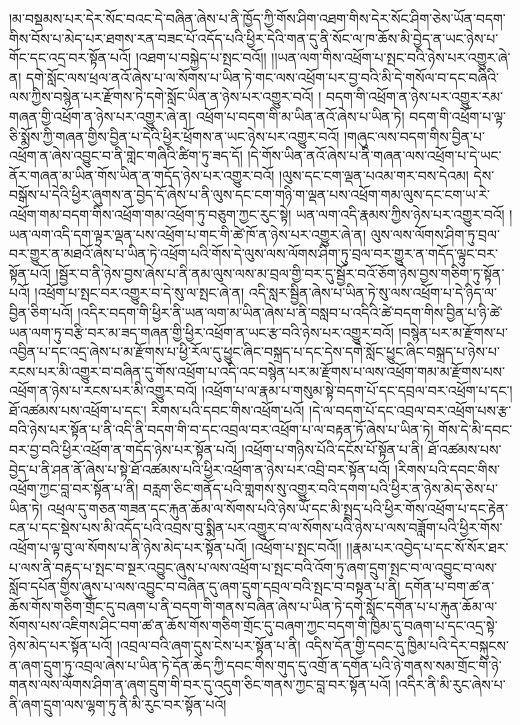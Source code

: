 །མ་བསྡམས་པར་དེར་སོང་བའང་དེ་བཞིན་ཞེས་པ་ནི་ཁྱོད་ཀྱི་གོས་ཤིག་འཐག་གིས་དེར་སོང་ཤིག་ཅེས་ཡོན་བདག་གིས་བོས་པ་མེད་པར་ཐགས་རན་བཟང་པོ་འདོད་པའི་ཕྱིར་དེའི་གན་དུ་ནི་སོང་ལ་ཁ་ཆོས་མི་བྱེད་ན་ཡང་ཉེས་པ་གོང་དང་འདྲ་བར་སྟོན་པའོ། །འཐག་པ་བསྐྱེད་པ་སྤང་བའོ།། །།ཡན་ལག་གིས་འཕྲོག་པ་སྤང་བའི་ཉེས་པར་འགྱུར་ཞེ་ན། དགེ་སློང་ལས་ཕྲལ་ནའོ་ཞེས་པ་ལ་སོགས་པ་ཡིན་ཏེ་གང་ལས་འཕྲོག་པར་བྱ་བའི་མི་དེ་གསོལ་བ་དང་བཞིའི་ལས་ཀྱིས་བསྙེན་པར་རྫོགས་ཏེ་དགེ་སློང་ཡིན་ན་ཉེས་པར་འགྱུར་བའོ། །
བདག་གི་འཕྲོག་ན་ཉེས་པར་འགྱུར་རམ་གཞན་གྱི་འཕྲོག་ན་ཉེས་པར་འགྱུར་ཞེ་ན། འཕྲོག་པ་བདག་གི་མ་ཡིན་ནའོ་ཞེས་པ་ཡིན་ཏེ། བདག་གི་འཕྲོག་པ་ལྟ་ཅི་སྨོས་ཀྱི་གཞན་གྱིས་བྱིན་པ་དེའི་ཕྱིར་ཕྲོགས་ན་ཡང་ཉེས་པར་འགྱུར་བའོ། །གཞུང་ལས་བདག་གིས་བྱིན་པ་འཕྲོག་ན་ཞེས་འབྱུང་བ་ནི་གླེང་གཞིའི་ཚིག་ཏུ་ཟད་དོ། །དེ་གོས་ཡིན་ནའོ་ཞེས་པ་ནི་གཞན་ལས་འཕྲོག་པ་དེ་ཡང་ནོར་གཞན་མ་ཡིན་གོས་ཡིན་ན་གདོད་ཉེས་པར་འགྱུར་བའོ། །ལུས་དང་ངག་ལྡན་པའམ་གར་བས་དེའམ། དེས་བསྒོས་པ་དེའི་ཕྱིར་ཞུགས་ན་བྱེད་དོ་ཞེས་པ་ནི་ལུས་དང་ངག་གཉི་ག་ལྡན་པས་འཕྲོག་གམ་ལུས་དང་ངག་ཡ་རེ་འཕྲོག་གམ་བདག་གིས་འཕྲོག་གམ་འཕྲོག་ཏུ་བཅུག་ཀྱང་རུང་སྟེ། ཡན་ལག་འདི་རྣམས་ཀྱིས་ཉེས་པར་འགྱུར་བའོ། །ཡན་ལག་འདི་དག་ལྟར་ལྡན་པས་འཕྲོག་པ་གང་གི་ཚེ་ཁོ་ན་ཉེས་པར་འགྱུར་ཞེ་ན། ལུས་ལས་ལོགས་ཤིག་ཏུ་བྲལ་བར་གྱུར་ན་མཐའོ་ཞེས་པ་ཡིན་ཏེ་འཕྲོག་པའི་གོས་དེ་ལུས་ལས་ལོགས་ཤིག་ཏུ་བྲལ་བར་གྱུར་ན་གདོད་ལྟུང་བར་སྟོན་པའོ། །སྦྱོར་བ་ནི་ཉེས་བྱས་ཞེས་པ་ནི་ནམ་ལུས་ལས་མ་བྲལ་གྱི་བར་དུ་སྦྱོར་བའོ་ཅོག་ཉེས་བྱས་གཅིག་ཏུ་སྟོན་པའོ། །འཕྲོག་པ་སྤང་བར་འགྱུར་བ་དེ་སུ་ལ་སྤང་ཞེ་ན། འདི་སླར་སྦྱིན་ཞེས་པ་ཡིན་ཏེ་སུ་ལས་འཕྲོག་པ་དེ་ཉིད་ལ་བྱིན་ཅིག་པའོ། །འདིར་བདག་གི་ཕྱིར་ནི་ཡན་ལག་མ་ཡིན་ཞེས་པ་ནི་བསླབ་པ་འདིའི་ཚེ་བདག་གིས་བྱིན་པ་ཉི་ཚེ་ཡན་ལག་ཏུ་བརྩི་བར་མ་ཟད་གཞན་གྱི་ཕྱིར་འཕྲོག་ན་ཡང་རྩ་བའི་ཉེས་པར་འགྱུར་བའོ། །བསྙེན་པར་མ་རྫོགས་པ་འབྱིན་པ་དང་འདྲ་ཞེས་པ་མ་རྫོགས་པ་ཕྱི་རོལ་དུ་ཕྱུང་ཞིང་བསྐྲད་པ་དང་དེས་དགེ་སློང་ཕྱུང་ཞིང་བསྐྲད་པ་ཉེས་པ་རངས་པར་མི་འགྱུར་བ་བཞིན་དུ་གོས་འཕྲོག་པ་འདི་འང་བསྙེན་པར་མ་རྫོགས་པ་ལས་འཕྲོག་གམ་མ་རྫོགས་པས་འཕྲོག་ན་ཉེས་པ་རངས་པར་མི་འགྱུར་བའོ། །འཕྲོག་པ་ལ་རྣམ་པ་གསུམ་སྟེ་བདག་པོ་དང་དབྲལ་བར་འཕྲོག་པ་དང་། ཐོ་འཚམས་པས་འཕྲོག་པ་དང་། རིགས་པའི་དབང་གིས་འཕྲོག་པའོ། །དེ་ལ་བདག་པོ་དང་འབྲལ་བར་འཕྲོག་པས་རྩ་བའི་ཉེས་པར་སྟོན་པ་ནི་འདི་ནི་བདག་གི་བ་དང་འབྲལ་བར་འཕྲོག་པ་ལ་བརྟན་ཏོ་ཞེས་པ་ཡིན་ཏེ། གོས་དེ་མི་དབང་བར་བྱ་བའི་ཕྱིར་འཕྲོག་ན་གདོད་ཉེས་པར་སྟོན་པའོ། །འཕྲོག་པ་གཉིས་པོའི་དངོས་པོ་སྟོན་པ་ནི། ཐོ་འཚམས་པས་བྱེད་པ་ནི་ཤན་ནོ་ཞེས་པ་སྟེ་ཐོ་འཚམས་པའི་ཕྱིར་འཕྲོག་ན་ཉེས་པར་འབྲི་བར་སྟོན་པའོ། །རིགས་པའི་དབང་གིས་འཕྲོག་ཀྱང་བླ་བར་སྟོན་པ་ནི། བརླག་ཅིང་གནོད་པའི་གླགས་སུ་འགྱུར་བའི་དགག་པའི་ཕྱིར་ན་ཉེས་མེད་ཅེས་པ་ཡིན་ཏེ། འཕྲལ་དུ་གཅན་གཟན་དང་རྐུན་ཆོམ་ལ་སོགས་པའི་ཉེས་ཡོ་དང་མི་སྤྲད་པའི་ཕྱིར་གོས་འཕྲོག་པ་དང་རྟེན་ངན་པ་དང་སྡེས་པས་མི་འདོད་པའི་འབྲས་བུ་སྨིན་པར་འགྱུར་བ་ལ་སོགས་པའི་ཉེས་པ་ལས་བཟློག་པའི་ཕྱིར་གོས་འཕྲོག་པ་ལྟ་བུ་ལ་སོགས་པ་ནི་ཉེས་མེད་པར་སྟོན་པའོ། །འཕྲོག་པ་སྤང་བའོ།། །།རྣམ་པར་འབྱེད་པ་དང་སོ་སོར་ཐར་པ་ལས་ནི་བརྟད་པ་སྤང་བ་སྔར་འབྱུང་ཞུས་པ་ལས་འཕྲོག་པ་སྤང་བའི་འོག་ཏུ་ཞག་དྲུག་སྤང་བ་ལ་འབྱུང་བ་ལས་སློབ་དཔོན་གྱིས་ཞུས་པ་ལས་འབྱུང་བ་བཞིན་དུ་ཞག་དྲུག་དབྲལ་བའི་སྤང་བ་བསྟན་པ་ནི། དགོན་པ་བག་ཚ་ན་ཆོས་གོས་གཅིག་གྲོང་དུ་བཞག་པ་ནི་བདག་གི་གནས་བཞིན་ཞེས་པ་ཡིན་ཏེ་དགེ་སློང་དགོན་པ་པ་རྐུན་ཆོམ་ལ་སོགས་པས་འཇིགས་ཤིང་བག་ཚ་ན་ཆོས་གོས་གཅིག་གྲོང་དུ་བཞག་ཀྱང་བདག་གི་ཁྱིམ་དུ་བཞག་པ་དང་འདྲ་སྟེ་ཉེས་མེད་པར་སྟོན་པའོ། །འབྲལ་བའི་ཞག་དུས་ངེས་པར་སྟོན་པ་ནི། འདིས་དོན་གྱི་དབང་དུ་ཁྱིམ་པའི་དེར་བསྐུངས་ན་ཞག་དྲུག་ཏུ་འབྲལ་ཞེས་པ་ཡིན་ཏེ་དོན་ཆེད་ཀྱི་དབང་གིས་གུད་དུ་འགྲོ་ན་དགོན་པའི་ཉེ་གནས་སམ་གྲོང་གི་ཉེ་གནས་ལས་ལོགས་ཤིག་ན་ཞག་དྲུག་གི་བར་དུ་འདུག་ཅིང་གནས་ཀྱང་བླ་བར་སྟོན་པའོ། །འདིར་ནི་མི་རུང་ཞེས་པ་ནི་ཞག་དྲུག་ལས་ལྷག་ཏུ་ནི་མི་རུང་བར་སྟོན་པའོ། 